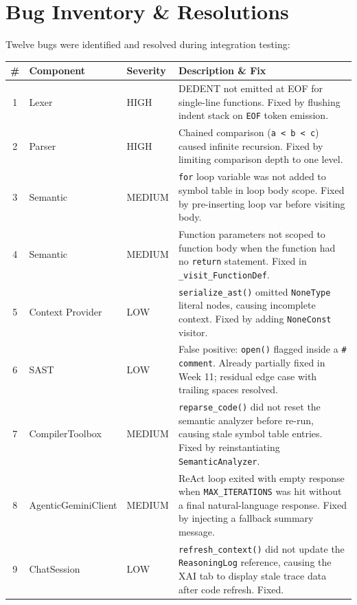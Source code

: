 \documentclass[a4paper,11pt]{article}
\begin{document}
\section{Bug Inventory \& Resolutions}

Twelve bugs were identified and resolved during integration testing:

\begin{table}[h]
\centering
\begin{tabularx}{\textwidth}{|c|l|l|X|}
\hline
\rowcolor{orange!10}
\textbf{\#} & \textbf{Component} & \textbf{Severity} & \textbf{Description \& Fix} \\
\hline
1 & Lexer & HIGH & DEDENT not emitted at EOF for single-line functions. Fixed by flushing indent stack on \texttt{EOF} token emission. \\
\hline
2 & Parser & HIGH & Chained comparison (\texttt{a < b < c}) caused infinite recursion. Fixed by limiting comparison depth to one level. \\
\hline
3 & Semantic & MEDIUM & \texttt{for} loop variable was not added to symbol table in loop body scope. Fixed by pre-inserting loop var before visiting body. \\
\hline
4 & Semantic & MEDIUM & Function parameters not scoped to function body when the function had no \texttt{return} statement. Fixed in \texttt{\_visit\_FunctionDef}. \\
\hline
5 & Context Provider & LOW & \texttt{serialize\_ast()} omitted \texttt{NoneType} literal nodes, causing incomplete context. Fixed by adding \texttt{NoneConst} visitor. \\
\hline
6 & SAST & LOW & False positive: \texttt{open()} flagged inside a \texttt{\# comment}. Already partially fixed in Week 11; residual edge case with trailing spaces resolved. \\
\hline
7 & CompilerToolbox & MEDIUM & \texttt{reparse\_code()} did not reset the semantic analyzer before re-run, causing stale symbol table entries. Fixed by reinstantiating \texttt{SemanticAnalyzer}. \\
\hline
8 & AgenticGeminiClient & MEDIUM & ReAct loop exited with empty response when \texttt{MAX\_ITERATIONS} was hit without a final natural-language response. Fixed by injecting a fallback summary message. \\
\hline
9 & ChatSession & LOW & \texttt{refresh\_context()} did not update the \texttt{ReasoningLog} reference, causing the XAI tab to display stale trace data after code refresh. Fixed. \\

\end{tabularx}
\end{table}
\end{document}
